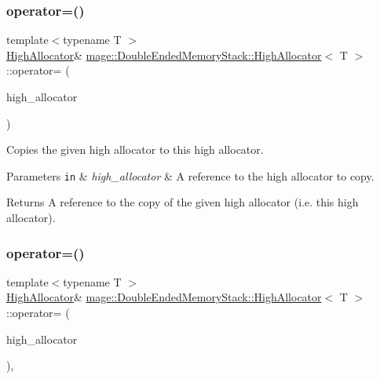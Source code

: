 \subsubsection{\texorpdfstring{operator=()}{operator=()}\hspace{0.1cm}{\footnotesize\ttfamily [1/2]}}
{\footnotesize\ttfamily template$<$typename T $>$ \\
\mbox{\hyperlink{classmage_1_1_double_ended_memory_stack_1_1_high_allocator}{High\+Allocator}}\& \mbox{\hyperlink{classmage_1_1_double_ended_memory_stack_1_1_high_allocator}{mage\+::\+Double\+Ended\+Memory\+Stack\+::\+High\+Allocator}}$<$ T $>$\+::operator= (\begin{DoxyParamCaption}\item[{const \mbox{\hyperlink{classmage_1_1_double_ended_memory_stack_1_1_high_allocator}{High\+Allocator}}$<$ T $>$ \&}]{high\+\_\+allocator }\end{DoxyParamCaption})\hspace{0.3cm}{\ttfamily [delete]}}

Copies the given high allocator to this high allocator.


\begin{DoxyParams}[1]{Parameters}
\mbox{\tt in}  & {\em high\+\_\+allocator} & A reference to the high allocator to copy. \\
\hline
\end{DoxyParams}
\begin{DoxyReturn}{Returns}
A reference to the copy of the given high allocator (i.\+e. this high allocator). 
\end{DoxyReturn}
\mbox{\label{classmage_1_1_double_ended_memory_stack_1_1_high_allocator_af9a43783cbf9d7dbce2aa8ae73c7d87b}} 
\subsubsection{\texorpdfstring{operator=()}{operator=()}\hspace{0.1cm}{\footnotesize\ttfamily [2/2]}}
{\footnotesize\ttfamily template$<$typename T $>$ \\
\mbox{\hyperlink{classmage_1_1_double_ended_memory_stack_1_1_high_allocator}{High\+Allocator}}\& \mbox{\hyperlink{classmage_1_1_double_ended_memory_stack_1_1_high_allocator}{mage\+::\+Double\+Ended\+Memory\+Stack\+::\+High\+Allocator}}$<$ T $>$\+::operator= (\begin{DoxyParamCaption}\item[{\mbox{\hyperlink{classmage_1_1_double_ended_memory_stack_1_1_high_allocator}{High\+Allocator}}$<$ T $>$ \&\&}]{high\+\_\+allocator }\end{DoxyParamCaption})\hspace{0.3cm}{\ttfamily [default]}, {\ttfamily [noexcept]}}

